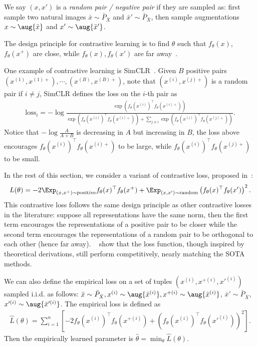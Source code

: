 We say $(x, x')$ is a \emph{random pair / negative pair} if they are sampled as: first sample two natural images $\bar{x}\sim \bar{P}_{\bar{X}}$ and $\bar{x}'\sim \bar{P}_{\bar{X}}$, then sample augmentations $x\sim\aug{\bar{x}}$ and $x'\sim\aug{\bar{x}'}$.

The design principle for contrastive learning is to find $\theta$ such that $f_{\theta}(x)$, $f_{\theta}(x^+)$ are close, while $f_{{\theta}}(x), f_{{\theta}}(x')$ are far away~\citep{chen2020simclr, zbontar2021barlow, he2020momentum}. 

One example of contrastive learning is SimCLR~\citep{chen2020simclr}.  Given $B$ positive pairs $(x^{(1)}, x^{(1)+}), \cdots, (x^{(B)}, x^{(B)+})$, note that $(x^{(i)}, x^{(j)+})$ is a random pair if $i\ne j$, SimCLR defines the loss on the $i$-th pair as 
\begin{align}
	\text{loss}_i = -\log\frac{\exp(f_{{\theta}}(x^{(i)})^\top f_{{\theta}}(x^{(i)+}))}{\exp(f_{{\theta}}(x^{(i)})^\top f_{{\theta}}(x^{(i)+}))+ \sum_{j\ne i} \exp(f_{{\theta}}(x^{(i)})^\top f_{{\theta}}(x^{(j)+}))}.
\end{align}
Notice that $-\log\frac{A}{A+B}$ is decreasing in $A$ but increasing in $B$, the loss above encourages $f_{{\theta}}(x^{(i)})^\top f_{{\theta}}(x^{(i)+})$ to be large, while $f_{{\theta}}(x^{(i)})^\top f_{{\theta}}(x^{(j)+})$ to be small.

In the rest of this section, we consider a variant of contrastive loss, proposed in~\cite{haochen2021provable}: 
\begin{align}
	L(\theta)  = -2\Exp_{(x, x^+) \sim\text{positive}} f_{{\theta}}(x)^\top f_{{\theta}}(x^+) + \Exp_{(x, x') \sim\text{random}}  \left(f_{{\theta}}(x)^\top f_{{\theta}}(x')\right)^2.
\end{align}
This contrastive loss follows the same design principle as other contrastive losses in the literature: suppose all representations have the same norm, then the first term encourages the representations of a positive pair to be closer while  the second term encourages the representations of a random pair to be orthogonal to each other (hence far away). ~\cite{haochen2021provable} show that the loss function, though inspired by theoretical derivations, still perform competitively, nearly matching the SOTA methods. 

We can also define the empirical loss on a set of tuples $(x^{(i)}, x^{+(i)}, x'^{(i)})$ sampled i.i.d. as follows: $\bar{x}\sim\bar{P}_{\bar{X}}, x^{(i)}\sim\aug{\bar{x}^{(i)}}, x^{+(i)}\sim\aug{\bar{x}^{(i)}}$, $\bar{x}'\sim\bar{P}_{\bar{X}}$, $x'^{(i)}\sim\aug{\bar{x}'^{(i)}}$. The empirical loss is defined as 
\begin{align}
	\hat{L}(\theta) = \sum_{i=1}^n \left[-2f_{{\theta}}(x^{(i)})^\top f_{{\theta}}(x^{+(i)}) + \left(f_{{\theta}}(x^{(i)})^\top f_{{\theta}}(x'^{(i)})\right)^2\right].
\end{align}
Then the empirically learned parameter is $\hat{\theta} = \min_{\theta} \hat{L}(\theta)$. 

